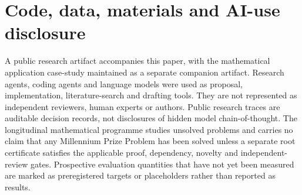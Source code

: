 \documentclass[11pt]{article}
\begin{document}
\section*{Code, data, materials and AI-use disclosure}
A public research artifact accompanies this paper, with the mathematical application case-study maintained as a separate companion artifact. Research agents, coding agents and language models were used as proposal, implementation, literature-search and drafting tools. They are not represented as independent reviewers, human experts or authors. Public research traces are auditable decision records, not disclosures of hidden model chain-of-thought. The longitudinal mathematical programme studies unsolved problems and carries no claim that any Millennium Prize Problem has been solved unless a separate root certificate satisfies the applicable proof, dependency, novelty and independent-review gates. Prospective evaluation quantities that have not yet been measured are marked as preregistered targets or placeholders rather than reported as results.


\end{document}
